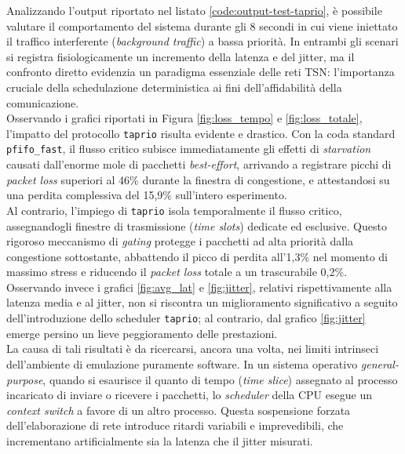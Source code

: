 \documentclass[12pt,a4paper,twoside]{book}
\begin{document}
\begin{onehalfspace}
Analizzando l'output riportato nel listato \ref{code:output-test-taprio}, è possibile valutare il comportamento del sistema durante gli 8 secondi in cui viene iniettato il traffico interferente (\textit{background traffic}) a bassa priorità. In entrambi gli scenari si registra fisiologicamente un incremento della latenza e del jitter, ma il confronto diretto evidenzia un paradigma essenziale delle reti TSN: l'importanza cruciale della schedulazione deterministica ai fini dell'affidabilità della comunicazione.
\\
Osservando i grafici riportati in Figura \ref{fig:loss_tempo} e \ref{fig:loss_totale}, l'impatto del protocollo \texttt{taprio} risulta evidente e drastico. Con la coda standard \texttt{pfifo\_fast}, il flusso critico subisce immediatamente gli effetti di \textit{starvation} causati dall'enorme mole di pacchetti \textit{best-effort}, arrivando a registrare picchi di \textit{packet loss} superiori al 46\% durante la finestra di congestione, e attestandosi su una perdita complessiva del 15,9\% sull'intero esperimento.
\\
Al contrario, l'impiego di \texttt{taprio} isola temporalmente il flusso critico, assegnandogli finestre di trasmissione (\textit{time slots}) dedicate ed esclusive. Questo rigoroso meccanismo di \textit{gating} protegge i pacchetti ad alta priorità dalla congestione sottostante, abbattendo il picco di perdita all'1,3\% nel momento di massimo stress e riducendo il \textit{packet loss} totale a un trascurabile 0,2\%.
\\
Osservando invece i grafici \ref{fig:avg_lat} e \ref{fig:jitter}, relativi rispettivamente alla latenza media e al jitter, non si riscontra un miglioramento significativo a seguito dell'introduzione dello scheduler \texttt{taprio}; al contrario, dal grafico \ref{fig:jitter} emerge persino un lieve peggioramento delle prestazioni.
\\
La causa di tali risultati è da ricercarsi, ancora una volta, nei limiti intrinseci dell'ambiente di emulazione puramente software. In un sistema operativo \textit{general-purpose}, quando si esaurisce il quanto di tempo (\textit{time slice}) assegnato al processo incaricato di inviare o ricevere i pacchetti, lo \textit{scheduler} della CPU esegue un \textit{context switch} a favore di un altro processo. Questa sospensione forzata dell'elaborazione di rete introduce ritardi variabili e imprevedibili, che incrementano artificialmente sia la latenza che il jitter misurati.



\end{onehalfspace}
\end{document}
